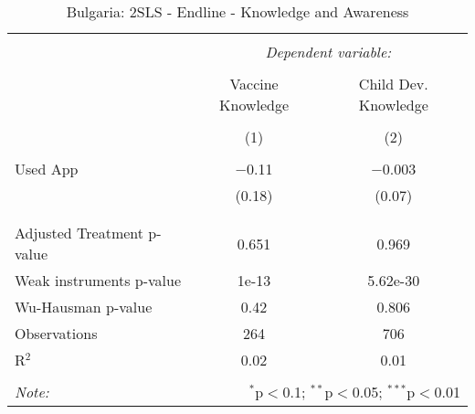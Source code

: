 
\begin{table}[!htbp] \centering 
  \caption{Bulgaria: 2SLS - Endline - Knowledge and Awareness} 
  \label{tbl:Bulgaria: 2SLS - Endline - Knowledge and Awareness} 
\begin{tabular}{@{\extracolsep{5pt}}lcc} 
\\[-1.8ex]\hline 
\hline \\[-1.8ex] 
 & \multicolumn{2}{c}{\textit{Dependent variable:}} \\ 
\cline{2-3} 
\\[-1.8ex] & Vaccine Knowledge & Child Dev. Knowledge \\ 
\\[-1.8ex] & (1) & (2)\\ 
\hline \\[-1.8ex] 
 Used App & $-$0.11 & $-$0.003 \\ 
  & (0.18) & (0.07) \\ 
  & & \\ 
\hline \\[-1.8ex] 
Adjusted Treatment p-value & 0.651 & 0.969 \\ 
Weak instruments p-value & 1e-13 & 5.62e-30 \\ 
Wu-Hausman p-value & 0.42 & 0.806 \\ 
Observations & 264 & 706 \\ 
R$^{2}$ & 0.02 & 0.01 \\ 
\hline 
\hline \\[-1.8ex] 
\textit{Note:}  & \multicolumn{2}{r}{$^{*}$p$<$0.1; $^{**}$p$<$0.05; $^{***}$p$<$0.01} \\ 
\end{tabular} 
\end{table} 
